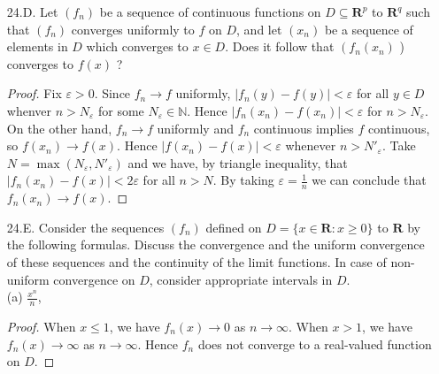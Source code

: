 \begin{itemize}
\begin{proof}
	Moreover, $f_n(x)$ is uniquely defined and continuous at each $x$. It is obvious unique in each interval $[1-\frac{1}{2^m}, 1-\frac{1}{2^{m+1}})$. At the boundaries, we have 
	\[
		\lim_{x \to 1-\frac{1}{2^{m+1}}; x \in [1-\frac{1}{2^{m}}, 1-\frac{1}{2^{m+1}})} f(x) =  
		\lim_{r \to \frac{1}{2^{m+1}}}1-\frac{1}{2^m} + r^n 2^{(m+1)(n-1)} = 1 - \frac{1}{2^m} + 2^{-m-1} = 1-\frac{1}{2^{m+1}}
	.\] 
\[
		\lim_{x \to 1-\frac{1}{2^{m+1}}; x \in (1-\frac{1}{2^{m+1}}, 1-\frac{1}{2^{m+2}})} f(x) =  
		\lim_{r \to 0}1-\frac{1}{2^{m+1}} + r^n 2^{(m+2)(n-1)} = 1 - \frac{1}{2^{m+1}}
	.\]
	Thus the left and right limits are equal to the value of function at any point. Hence $f_n$ is continuous.
\end{proof}

\item
	[24.D.] Let $\left(f_n\right)$ be a sequence of continuous functions on $D \subseteq \boldsymbol{R}^p$ to $\boldsymbol{R}^q$ such that $\left(f_n\right)$ converges uniformly to $f$ on $D$, and let $\left(x_n\right)$ be a sequence of elements in $D$ which converges to $x \in D$. Does it follow that $\left(f_n\left(x_n\right)\right.$ ) converges to $f(x)$ ?
\begin{proof}
	Fix $\varepsilon>0$. Since $f_n \to f$ uniformly, $|f_n(y) - f(y)| < \varepsilon $ for all  $y \in D$ whenver $n > N_\varepsilon$ for some $N_\varepsilon \in \mathbb{N}$.
	Hence $|f_n(x_n) - f(x_n) |< \varepsilon$ for $n > N_\varepsilon$. On the other hand, $f_n \to f $ uniformly and $f_n$ continuous implies $f$ continuous, so $f(x_n) \to f(x)$. Hence $|f(x_n) - f(x)| < \varepsilon$ whenever $n > N'_\varepsilon$. Take $N = \max(N_\varepsilon, N'_\varepsilon)$ and we have, by triangle inequality, that $|f_n(x_n) - f(x)| < 2 \varepsilon$ for all $n > N$. By taking $\varepsilon = \frac{1}{n}$ we can conclude that $f_n(x_n) \to f(x)$.
\end{proof}

\item 
	[24.E.] Consider the sequences $\left(f_n\right)$ defined on $D=\{x \in \boldsymbol{R}: x \geq 0\}$ to $\boldsymbol{R}$ by the following formulas.
Discuss the convergence and the uniform convergence of these sequences and the continuity of the limit functions. In case of non-uniform convergence on $D$, consider appropriate intervals in $D$.\\
(a) $\frac{x^n}{n}$,
\begin{proof}
	When $x\le 1$, we have $f_n(x) \to 0$ as $n \to  \infty $. When $x > 1$, we have $f_n(x) \to \infty $ as $n \to \infty $. Hence $f_n$ does not converge to a real-valued function on $D$.
\end{proof}


\end{itemize}
